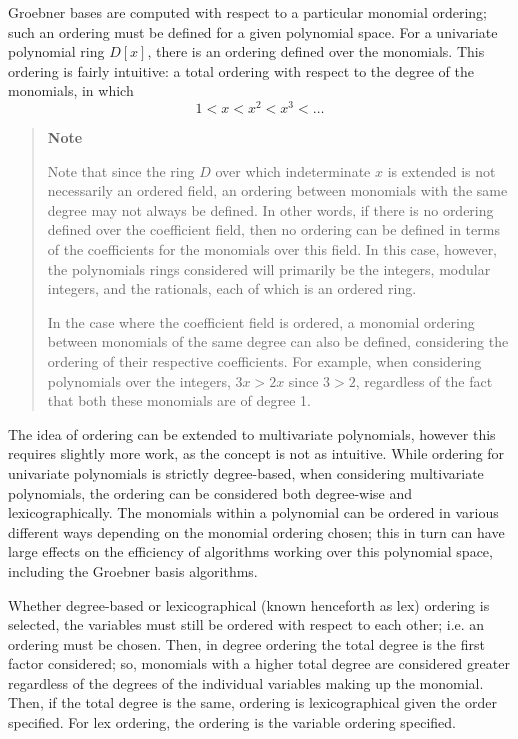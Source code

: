 \documentclass[letterpaper,12pt,titlepage,oneside,final]{book}
\newcounter{notecounter}
\newenvironment{note}{\begin{quote}%
    \refstepcounter{notecounter}%
  \textbf{Note \arabic{notecounter}}%
  \quad
}{%
\end{quote}%
}
\begin{document}
Groebner bases are computed with respect to a particular monomial ordering; such an ordering must be defined for a given polynomial space.  For a univariate polynomial ring ${D[x]}$, there is an ordering defined over the monomials.  This ordering is fairly intuitive: a total ordering with respect to the degree of the monomials, in which
\begin{equation*}
  1 < x < x^2 < x^3 < \ldots
\end{equation*}

\begin{note}
  Note that since the ring ${D}$ over which indeterminate ${x}$ is extended is not necessarily an ordered field, an ordering between monomials with the same degree may not always be defined.  In other words, if there is no ordering defined over the coefficient field, then no ordering can be defined in terms of the coefficients for the monomials over this field.  In this case, however, the polynomials rings considered will primarily be the integers, modular integers, and the rationals, each of which is an ordered ring.  

  In the case where the coefficient field is ordered, a monomial ordering between monomials of the same degree can also be defined, considering the ordering of their respective coefficients.  For example, when considering polynomials over the integers, ${3x > 2x}$ since ${3 > 2}$, regardless of the fact that both these monomials are of degree 1.
\end{note}

The idea of ordering can be extended to multivariate polynomials, however this requires slightly more work, as the concept is not as intuitive.  While ordering for univariate polynomials is strictly degree-based, when considering multivariate polynomials, the ordering can be considered both degree-wise and lexicographically.  The monomials within a polynomial can be ordered in various different ways depending on the monomial ordering chosen; this in turn can have large effects on the efficiency of algorithms working over this polynomial space, including the Groebner basis algorithms.

Whether degree-based or lexicographical (known henceforth as lex) ordering is selected, the variables must still be ordered with respect to each other; i.e. an ordering must be chosen.  Then, in degree ordering the total degree is the first factor considered; so, monomials with a higher total degree are considered greater regardless of the degrees of the individual variables making up the monomial.  Then, if the total degree is the same, ordering is lexicographical given the order specified.  For lex ordering, the ordering is the variable ordering specified.
\end{document}
